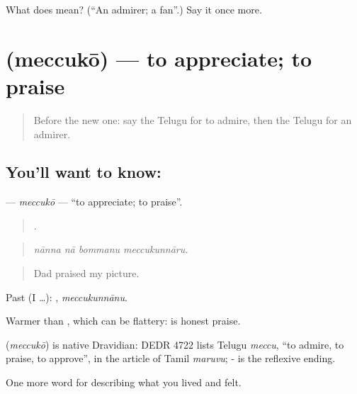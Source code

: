 \begin{tcolorbox}[breakable,colback=teal!4,colframe=teal!35!black,title={Before you move on}]
What does  mean? (\textquotedblleft{}An admirer; a fan\textquotedblright{}.) Say it once more.
\end{tcolorbox}
\section[\texorpdfstring{\te{మెచ్చుకో} (meccukō)}{మెచ్చుకో (meccukō)}]{ (meccukō) — to appreciate; to praise}

\label{lesson:TE-C504-meccuko}



\begin{quote}
Before the new one: say the Telugu for to admire, then the Telugu for an admirer.
\end{quote}

\subsection*{You'll want to know: }
\textbf{} — \emph{meccukō} — \textquotedblleft{}to appreciate; to praise\textquotedblright{}.

\begin{quote}
   .
\end{quote}

\begin{quote}
\emph{nānna nā bommanu meccukunnāru.}
\end{quote}

\begin{quote}
Dad praised my picture.
\end{quote}

Past (I …): , \emph{meccukunnānu}.

Warmer than , which can be flattery:  is honest praise.

\begin{cousinweb}
\textbf{} (\emph{meccukō}) is native Dravidian: DEDR 4722 lists Telugu \emph{meccu}, \textquotedblleft{}to admire, to praise, to approve\textquotedblright{}, in the article of Tamil \emph{maruvu}; - is the reflexive ending.
\end{cousinweb}

\begin{grammarlens}[title={What you've built}]
One more word for describing what you lived and felt.
\end{grammarlens}

